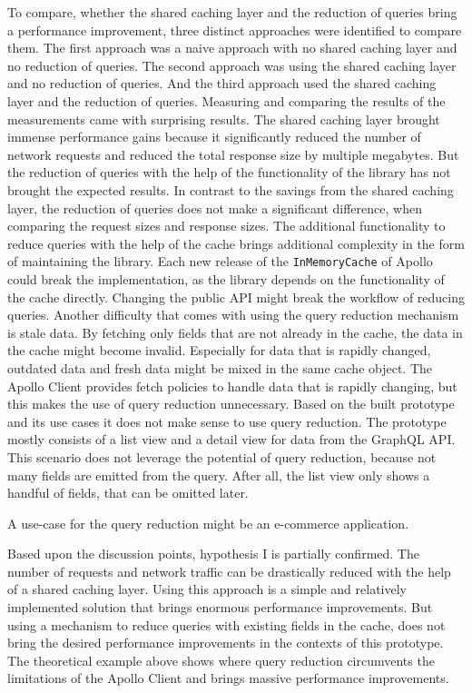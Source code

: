 \noindent To compare, whether the shared caching layer and the reduction of queries bring a performance improvement, three distinct approaches were identified to compare them. The first approach was a naive approach with no shared caching layer and no reduction of queries. The second approach was using the shared caching layer and no reduction of queries. And the third approach used the shared caching layer and the reduction of queries. Measuring and comparing the results of the measurements came with surprising results. The shared caching layer brought immense performance gains because it significantly reduced the number of network requests and reduced the total response size by multiple megabytes. But the reduction of queries with the help of the functionality of the library has not brought the expected results. In contrast to the savings from the shared caching layer, the reduction of queries does not make a significant difference, when comparing the request sizes and response sizes. The additional functionality to reduce queries with the help of the cache brings additional complexity in the form of maintaining the library. Each new release of the \texttt{InMemoryCache} of Apollo could break the implementation, as the library depends on the functionality of the cache directly. Changing the public \ac{API} might break the workflow of reducing queries. Another difficulty that comes with using the query reduction mechanism is stale data. By fetching only fields that are not already in the cache, the data in the cache might become invalid. Especially for data that is rapidly changed, outdated data and fresh data might be mixed in the same cache object. The Apollo Client provides fetch policies to handle data that is rapidly changing, but this makes the use of query reduction unnecessary. Based on the built prototype and its use cases it does not make sense to use query reduction. The prototype mostly consists of a list view and a detail view for data from the GraphQL \ac{API}. This scenario does not leverage the potential of query reduction, because not many fields are emitted from the query. After all, the list view only shows a handful of fields, that can be omitted later.

\bigskip

\noindent A use-case for the query reduction might be an e-commerce application.

\bigskip

\noindent Based upon the discussion points, hypothesis I is partially confirmed. The number of requests and network traffic can be drastically reduced with the help of a shared caching layer. Using this approach is a simple and relatively implemented solution that brings enormous performance improvements. But using a mechanism to reduce queries with existing fields in the cache, does not bring the desired performance improvements in the contexts of this prototype. The theoretical example above shows where query reduction circumvents the limitations of the Apollo Client and brings massive performance improvements.

